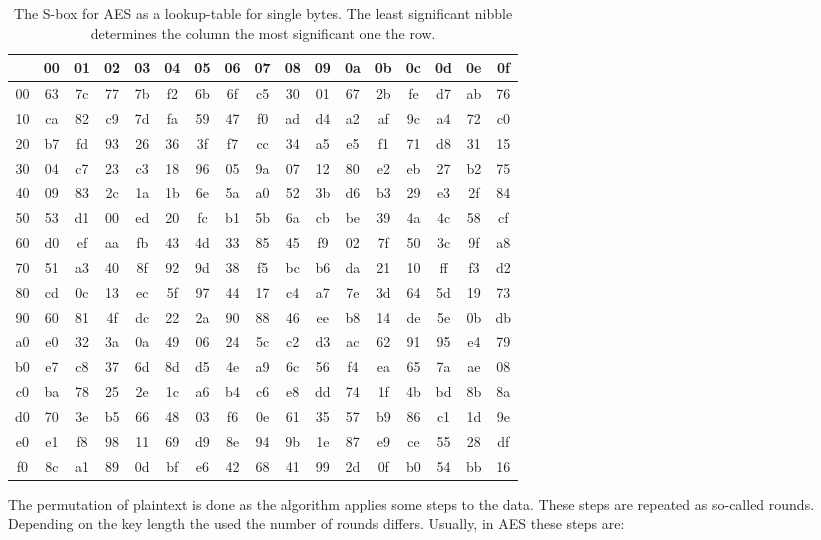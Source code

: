\begin{table}[]
\centering
\begin{tabular}{c|cccccccccccccccc}
   & 00 & 01 & 02 & 03 & 04 & 05 & 06 & 07 & 08 & 09 & 0a & 0b & 0c & 0d & 0e &
0f \\ \hline
00 & 63 & 7c & 77 & 7b & f2 & 6b & 6f & c5 & 30 & 01 & 67 & 2b & fe & d7 & ab &
76 \\
10 & ca & 82 & c9 & 7d & fa & 59 & 47 & f0 & ad & d4 & a2 & af & 9c & a4 & 72 &
c0 \\
20 & b7 & fd & 93 & 26 & 36 & 3f & f7 & cc & 34 & a5 & e5 & f1 & 71 & d8 & 31 &
15 \\
30 & 04 & c7 & 23 & c3 & 18 & 96 & 05 & 9a & 07 & 12 & 80 & e2 & eb & 27 & b2 &
75 \\
40 & 09 & 83 & 2c & 1a & 1b & 6e & 5a & a0 & 52 & 3b & d6 & b3 & 29 & e3 & 2f &
84 \\
50 & 53 & d1 & 00 & ed & 20 & fc & b1 & 5b & 6a & cb & be & 39 & 4a & 4c & 58 &
cf \\
60 & d0 & ef & aa & fb & 43 & 4d & 33 & 85 & 45 & f9 & 02 & 7f & 50 & 3c & 9f &
a8 \\
70 & 51 & a3 & 40 & 8f & 92 & 9d & 38 & f5 & bc & b6 & da & 21 & 10 & ff & f3 &
d2 \\
80 & cd & 0c & 13 & ec & 5f & 97 & 44 & 17 & c4 & a7 & 7e & 3d & 64 & 5d & 19 &
73 \\
90 & 60 & 81 & 4f & dc & 22 & 2a & 90 & 88 & 46 & ee & b8 & 14 & de & 5e & 0b &
db \\
a0 & e0 & 32 & 3a & 0a & 49 & 06 & 24 & 5c & c2 & d3 & ac & 62 & 91 & 95 & e4 &
79 \\
b0 & e7 & c8 & 37 & 6d & 8d & d5 & 4e & a9 & 6c & 56 & f4 & ea & 65 & 7a & ae &
08 \\
c0 & ba & 78 & 25 & 2e & 1c & a6 & b4 & c6 & e8 & dd & 74 & 1f & 4b & bd & 8b &
8a \\
d0 & 70 & 3e & b5 & 66 & 48 & 03 & f6 & 0e & 61 & 35 & 57 & b9 & 86 & c1 & 1d &
9e \\
e0 & e1 & f8 & 98 & 11 & 69 & d9 & 8e & 94 & 9b & 1e & 87 & e9 & ce & 55 & 28 &
df \\
f0 & 8c & a1 & 89 & 0d & bf & e6 & 42 & 68 & 41 & 99 & 2d & 0f & b0 & 54 & bb &
16
\end{tabular}
\caption{The S-box for AES as a lookup-table for single bytes. The least
significant nibble determines the column the most significant one the row.}
\label{tab:sbox}
\end{table}

The permutation of plaintext is done as the algorithm applies some steps to the
data. These steps are repeated as so-called rounds. Depending on the key length
the used the number of rounds differs. Usually, in AES these steps are:

